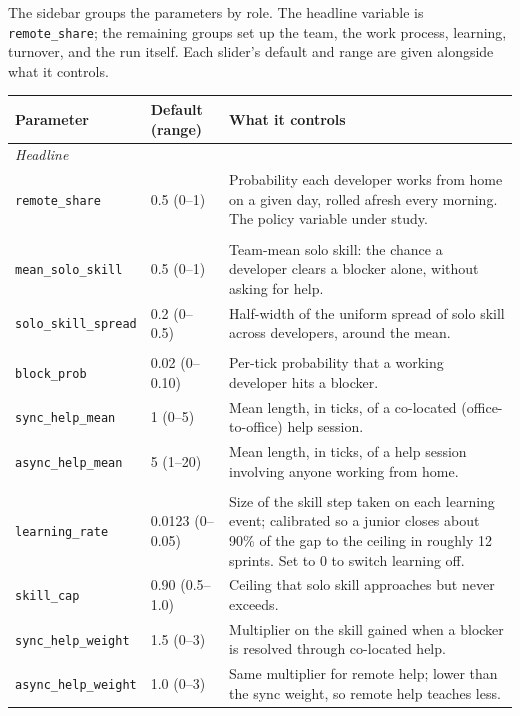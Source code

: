\documentclass[11pt,a4paper]{article}
\begin{document}
The sidebar groups the parameters by role. The headline variable is \texttt{remote_share}; the
remaining groups set up the team, the work process, learning, turnover, and the run itself. Each
slider's default and range are given alongside what it controls.

\begin{center}
\begin{tabular}{llp{8.0cm}}
\toprule
Parameter & Default (range) & What it controls \\
\midrule
\multicolumn{3}{l}{\textit{Headline}}\\
\texttt{remote_share} & 0.5 (0--1) & Probability each developer works from home on a given day, rolled afresh every morning. The policy variable under study. \\
\addlinespace
\multicolumn{3}{l}{\textit{Team heterogeneity}}\\
\texttt{mean_solo_skill} & 0.5 (0--1) & Team-mean solo skill: the chance a developer clears a blocker alone, without asking for help. \\
\texttt{solo_skill_spread} & 0.2 (0--0.5) & Half-width of the uniform spread of solo skill across developers, around the mean. \\
\addlinespace
\multicolumn{3}{l}{\textit{Process}}\\
\texttt{block_prob} & 0.02 (0--0.10) & Per-tick probability that a working developer hits a blocker. \\
\texttt{sync_help_mean} & 1 (0--5) & Mean length, in ticks, of a co-located (office-to-office) help session. \\
\texttt{async_help_mean} & 5 (1--20) & Mean length, in ticks, of a help session involving anyone working from home. \\
\addlinespace
\multicolumn{3}{l}{\textit{Learning}}\\
\texttt{learning_rate} & 0.0123 (0--0.05) & Size of the skill step taken on each learning event; calibrated so a junior closes about 90\% of the gap to the ceiling in roughly 12 sprints. Set to 0 to switch learning off. \\
\texttt{skill_cap} & 0.90 (0.5--1.0) & Ceiling that solo skill approaches but never exceeds. \\
\texttt{sync_help_weight} & 1.5 (0--3) & Multiplier on the skill gained when a blocker is resolved through co-located help. \\
\texttt{async_help_weight} & 1.0 (0--3) & Same multiplier for remote help; lower than the sync weight, so remote help teaches less. \\

\end{tabular}
\end{center}
\end{document}
